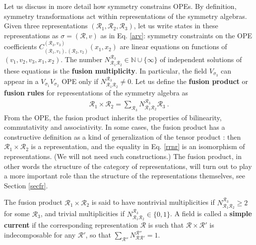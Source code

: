 \documentclass[12pt, a4paper, notitlepage, twoside]{report}
\numberwithin{equation}{section}
\theoremstyle{break}
\begin{document}
Let us discuss in more detail how symmetry constrains OPEs. By definition, symmetry transformations act within representations of the symmetry algebras. Given three representations $(\mathcal{R}_1,\mathcal{R}_2,\mathcal{R}_3)$, let us write states in these representations as $\sigma=(\mathcal{R},v)$ as in Eq. \eqref{arv}: symmetry constraints on the OPE coefficients $C_{(\mathcal{R}_1,v_1),(\mathcal{R}_2,v_2)}^{(\mathcal{R}_3,v_3)}(x_1,x_2)$ are linear equations on functions of $(v_1,v_2,v_3,x_1,x_2)$. The number $N_{\mathcal{R}_1\mathcal{R}_2}^{\mathcal{R}_3}\in {\mathbb{N}} \cup \{\infty\}$ of independent solutions of these equations is the \textbf{\boldmath fusion multiplicity}. 
In particular, the field $V_{\sigma_3}$ can appear in a $V_{\sigma_1}V_{\sigma_2}$ OPE only if $N_{\mathcal{R}_1\mathcal{R}_2}^{\mathcal{R}_3}\neq 0$. Let us define the \textbf{\boldmath fusion product} or \textbf{\boldmath fusion rules} for representations of the symmetry algebra as 
 \begin{align}
 \mathcal{R}_1 \times \mathcal{R}_2  = \sum_{\mathcal{R}_3} N_{\mathcal{R}_1\mathcal{R}_2}^{\mathcal{R}_3} \mathcal{R}_3 \ . 
\label{rrnr}
\end{align}
From the OPE, the fusion product inherits the properties of bilinearity, commutativity and associativity. 
In some cases, the fusion product has a constructive definition as a kind of generalization of the tensor product \cite{gab99, kr18}: then $ \mathcal{R}_1 \times \mathcal{R}_2$ is a representation, and the equality in Eq. \eqref{rrnr} is an isomorphism of representations. (We will not need such constructions.) The fusion product, in other words the structure of the category of representations, will turn out to play a more important role than the structure of the representations themselves, see Section \ref{secfr}.  

The fusion product $\mathcal{R}_1\times \mathcal{R}_2$ is said to have nontrivial multiplicities if $N_{\mathcal{R}_1\mathcal{R}_2}^{\mathcal{R}_3}\geq 2$ for some $\mathcal{R}_3$, and trivial multiplicities if $N_{\mathcal{R}_1\mathcal{R}_2}^{\mathcal{R}_3}\in \{0,1\}$.
A field is called a \textbf{\boldmath simple current} if the corresponding representation $\mathcal{R}$ is such that $\mathcal{R}\times \mathcal{R}'$ is indecomposable for any $\mathcal{R}'$, so that $\sum_{\mathcal{R}''} N_{\mathcal{R}\mathcal{R}'}^{\mathcal{R}''} =1$. 
\end{document}
